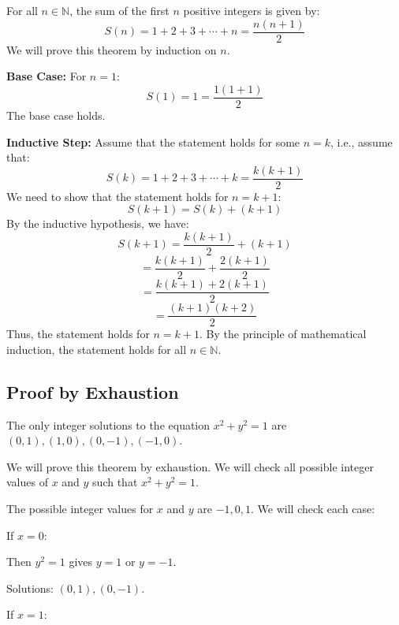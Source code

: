 For all \( n \in \mathbb{N} \), the sum of the first \( n \) positive integers is given by:
\[
	S(n) = 1 + 2 + 3 + \cdots + n = \frac{n(n+1)}{2}
\]
We will prove this theorem by induction on \( n \).
\vspace{\baselineskip}

	\textbf{Base Case:} For \( n = 1 \):
	\[
		S(1) = 1 = \frac{1(1+1)}{2}
	\]
	The base case holds.
\vspace{\baselineskip}

	\textbf{Inductive Step:} Assume that the statement holds for some \( n = k \), i.e., assume that:
	\[
		S(k) = 1 + 2 + 3 + \cdots + k = \frac{k(k+1)}{2}
	\]
	We need to show that the statement holds for \( n = k + 1 \):
	\[
		S(k+1) = S(k) + (k + 1)
	\]
	By the inductive hypothesis, we have:
	\[
		S(k+1) = \frac{k(k+1)}{2} + (k + 1)
	\]
	\[
		= \frac{k(k+1)}{2} + \frac{2(k + 1)}{2}
	\]
	\[      = \frac{k(k+1) + 2(k + 1)}{2}
	\]
	\[
		= \frac{(k + 1)(k + 2)}{2}
	\]
	Thus, the statement holds for \( n = k + 1 \).
	By the principle of mathematical induction, the statement holds for all \( n \in \mathbb{N} \).

\QED

\subsection{Proof by Exhaustion}

The only integer solutions to the equation \( x^2 + y^2 = 1 \) are \( (0, 1), (1, 0), (0, -1), (-1, 0) \).
\vspace{\baselineskip}

	We will prove this theorem by exhaustion. We will check all possible integer values of \( x \) and \( y \) such that \( x^2 + y^2 = 1 \).
\vspace{\baselineskip}

	The possible integer values for \( x \) and \( y \) are \( -1, 0, 1 \). We will check each case:
	\vspace{\baselineskip}

	If \( x = 0 \):
	\vspace{\baselineskip}

	Then \( y^2 = 1 \) gives \( y = 1 \) or \( y = -1 \).
	\vspace{\baselineskip}

	Solutions: \( (0, 1), (0, -1) \).
	\vspace{\baselineskip}

	If \( x = 1 \):
	\vspace{\baselineskip}

